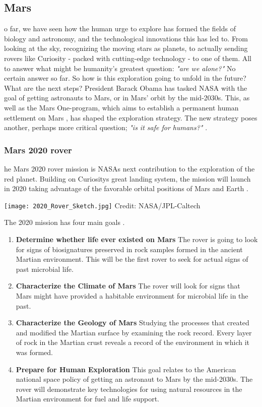 \subsection{Mars}
o far, we have seen how the human urge to explore has formed the fields of biology and astronomy, and the technological innovations this has led to.
From looking at the sky, recognizing the moving stars as planets, to actually sending rovers like Curiosity - packed with cutting-edge technology - to one of them.
All to answer what might be humanity's greatest question: \emph{"are we alone?"}
No certain answer so far.
So how is this exploration going to unfold in the future?
What are the next steps?
President Barack Obama has tasked NASA with the goal of getting astronauts to Mars, or in Mars' orbit by the mid-2030s.
This, as well as the Mars One-program, which aims to establish a permanent human settlement on Mars \cite{FPlan12}, has shaped the exploration strategy.
The new strategy poses another, perhaps more critical question; \emph{"is it safe for humans?"} \cite{FPlan01}.

\subsubsection{Mars 2020 rover}

he Mars 2020 rover mission is NASAs next contribution to the exploration of the red planet. 
Building on Curiositys great landing system, the mission will launch in 2020 taking advantage of the favorable orbital positions of Mars and Earth \cite{FPlan14}. 

\begin{center}
	\texttt{[image: 2020\_Rover\_Sketch.jpg]}
	\tiny{Credit: NASA/JPL-Caltech}
\end{center}

The 2020 mission has four main goals \cite{FPlan13}.

\begin{enumerate}
	\item \textbf{Determine whether life ever existed on Mars}
The rover is going to look for signs of biosignatures preserved in rock samples formed in the ancient Martian environment.
This will be the first rover to seek for actual signs of past microbial life.
	\item \textbf{Characterize the Climate of Mars}
The rover will look for signs that Mars might have provided a habitable environment for microbial life in the past. 
	\item \textbf{Characterize the Geology of Mars}
Studying the processes that created and modified the Martian surface by examining the rock record.
Every layer of rock in the Martian crust reveals a record of the environment in which it was formed.
	\item \textbf{Prepare for Human Exploration}
This goal relates to the American national space policy of getting an astronaut to Mars by the mid-2030s.
The rover will demonstrate key technologies for using natural resources in the Martian environment for fuel and life support. 
\end{enumerate}

